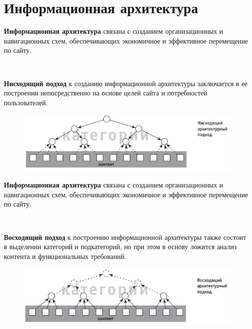 \documentclass{beamer}
\begin{document}
\section{Информационная архитектура}

\begin{frame}[t]
\textbf{Информационная архитектура} связана с созданием организационных и навигационных схем, обеспечивающих экономичное и эффективное перемещение по сайту. 

~

\textbf{Нисходящий подход} к созданию информационной архитектуры заключается в ее построении непосредственно на основе целей сайта и потребностей пользователей. 
\begin{figure}[h]
\centering
\includegraphics[scale=0.5]{images/lec03-pic07.png}
\end{figure}
\end{frame} 

\begin{frame}[t]
\textbf{Информационная архитектура} связана с созданием организационных и навигационных схем, обеспечивающих экономичное и эффективное перемещение по сайту. 

~

\textbf{Восходящий подход} к построению информационной архитектуры также состоит в выделении категорий и подкатегорий, но при этом в основу ложится анализ контента и функциональных требований. 
\begin{figure}[h]
\centering
\includegraphics[scale=0.6]{images/lec03-pic08.png}
\end{figure}
\end{frame} 
\end{document}
